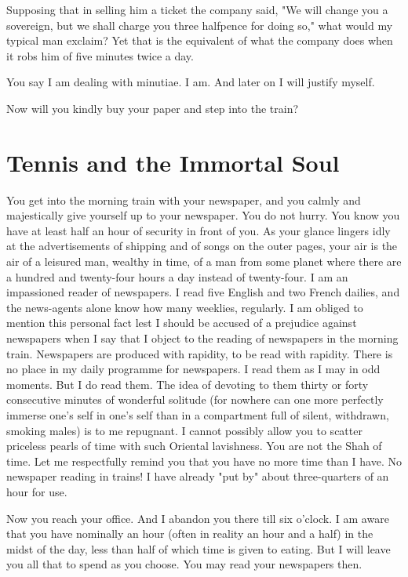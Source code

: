 Supposing that in selling him a ticket the company said, "We will
change you a sovereign, but we shall charge you three halfpence for
doing so," what would my typical man exclaim?  Yet that is the
equivalent of what the company does when it robs him of five minutes
twice a day.

You say I am dealing with minutiae.  I am.  And later on I will justify
myself.

Now will you kindly buy your paper and step into the train?


\addtocounter{chapter}{1}\chapter*{Tennis and the Immortal Soul}

You get into the morning train with your newspaper, and you calmly and
majestically give yourself up to your newspaper.  You do not hurry.
You know you have at least half an hour of security in front of you.
As your glance lingers idly at the advertisements of shipping and of
songs on the outer pages, your air is the air of a leisured man,
wealthy in time, of a man from some planet where there are a hundred
and twenty-four hours a day instead of twenty-four.  I am an
impassioned reader of newspapers. I read five English and two French
dailies, and the news-agents alone know how many weeklies, regularly.
I am obliged to mention this personal fact lest I should be accused of
a prejudice against newspapers when I say that I object to the reading
of newspapers in the morning train. Newspapers are produced with
rapidity, to be read with rapidity. There is no place in my daily
programme for newspapers.  I read them as I may in odd moments. But I
do read them.  The idea of devoting to them thirty or forty consecutive
minutes of wonderful solitude (for nowhere can one more perfectly
immerse one's self in one's self than in a compartment full of silent,
withdrawn, smoking males) is to me repugnant.  I cannot possibly allow
you to scatter priceless pearls of time with such Oriental lavishness.
You are not the Shah of time. Let me respectfully remind you that you
have no more time than I have.  No newspaper reading in trains!  I have
already "put by" about three-quarters of an hour for use.

Now you reach your office.  And I abandon you there till six o'clock.
I am aware that you have nominally an hour (often in reality an hour
and a half) in the midst of the day, less than half of which time is
given to eating.  But I will leave you all that to spend as you choose.
You may read your newspapers then.

